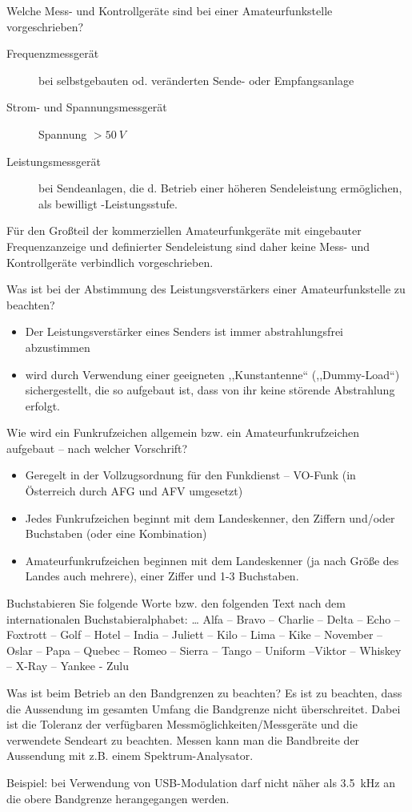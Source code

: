 \documentclass[avery5371,grid,frame,a4paper]{flashcards}
\newcommand{\card}[3]{
  \begin{flashcard}[{\chap} -- #1]{#2}#3\end{flashcard}
}
\begin{document}
\card{48}{Welche Mess- und Kontrollgeräte sind bei einer Amateurfunkstelle vorgeschrieben?}{
  \small
  \begin{description}
    \item[Frequenzmessgerät] bei selbstgebauten od. veränderten Sende- oder Empfangsanlage
    \item[Strom- und Spannungsmessgerät] Spannung $>50~V$
    \item[Leistungsmessgerät] bei Sendeanlagen, die d. Betrieb einer höheren Sendeleistung ermöglichen, als bewilligt -Leistungsstufe.
  \end{description}
  Für den Großteil der kommerziellen Amateurfunkgeräte mit eingebauter Frequenzanzeige und definierter Sendeleistung sind daher keine Mess- und Kontrollgeräte verbindlich vorgeschrieben.
}
\card{49}{Was ist bei der Abstimmung des Leistungsverstärkers einer Amateurfunkstelle zu beachten?}{
  \begin{itemize}
    \item Der Leistungsverstärker eines Senders ist immer abstrahlungsfrei abzustimmen
    \item wird durch Verwendung einer geeigneten ,,Kunstantenne`` (,,Dummy-Load``) sichergestellt, die so aufgebaut ist, dass von ihr keine störende Abstrahlung erfolgt.
  \end{itemize}
}
\card{50}{Wie wird ein Funkrufzeichen allgemein bzw. ein Amateurfunkrufzeichen aufgebaut – nach welcher Vorschrift?}{
  \begin{itemize}
    \item Geregelt in der Vollzugsordnung für den Funkdienst – VO-Funk (in Österreich durch AFG und AFV umgesetzt)
    \item Jedes Funkrufzeichen beginnt mit dem Landeskenner, den Ziffern und/oder Buchstaben (oder eine Kombination)
    \item Amateurfunkrufzeichen beginnen mit dem Landeskenner (ja nach Größe des Landes auch mehrere), einer Ziffer und 1-3 Buchstaben.
  \end{itemize}
}
\card{51}{Buchstabieren Sie folgende Worte bzw. den folgenden Text nach dem internationalen Buchstabieralphabet: \dots}{
  Alfa – Bravo – Charlie – Delta – Echo – Foxtrott – Golf – Hotel – India – Juliett – Kilo – Lima – Kike – November – Oslar – Papa – Quebec – Romeo – Sierra – Tango – Uniform –Viktor – Whiskey – X-Ray – Yankee - Zulu
}
\card{52}{Was ist beim Betrieb an den Bandgrenzen zu beachten?}{
  Es ist zu beachten, dass die Aussendung im gesamten Umfang die Bandgrenze nicht überschreitet. Dabei ist die Toleranz der verfügbaren Messmöglichkeiten/Messgeräte und die verwendete Sendeart zu beachten. Messen kann man die Bandbreite der Aussendung mit z.B. einem Spektrum-Analysator.

  Beispiel: bei Verwendung von USB-Modulation darf nicht näher als \SI{3,5}{\kilo\Hz} an die obere Bandgrenze herangegangen werden.
}
\end{document}
